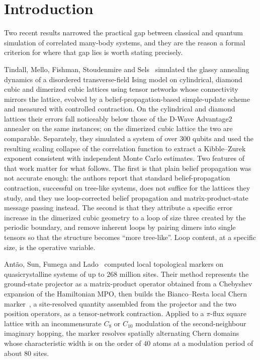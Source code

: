 \documentclass[aps,prx,reprint,nofootinbib,floatfix]{revtex4-2}
\begin{document}
\section{Introduction}
\label{sec:intro}

Two recent results narrowed the practical gap between classical and quantum
simulation of correlated many-body systems, and they are the reason a formal
criterion for where that gap lies is worth stating precisely.

Tindall, Mello, Fishman, Stoudenmire and
Sels~\cite{TindallMelloFishmanStoudenmireSels2026Science392} simulated the
glassy annealing dynamics of a disordered transverse-field Ising model on
cylindrical, diamond cubic and dimerized cubic lattices using tensor networks
whose connectivity mirrors the lattice, evolved by a belief-propagation-based
simple-update scheme and measured with controlled contraction. On the
cylindrical and diamond lattices their errors fall noticeably below those of
the D-Wave Advantage2 annealer on the same instances; on the dimerized cubic
lattice the two are comparable. Separately, they simulated a system of over
$300$ qubits and used the resulting scaling collapse of the correlation
function to extract a Kibble--Zurek exponent consistent with independent Monte
Carlo estimates. Two features of that work
matter for what follows. The first is that plain belief propagation was not
accurate enough: the authors report that standard belief-propagation
contraction, successful on tree-like systems, does not suffice for the lattices
they study, and they use loop-corrected belief propagation and matrix-product-state
message passing instead. The second is that they attribute a specific error
increase in the dimerized cubic geometry to a loop of size three created by the
periodic boundary, and remove inherent loops by pairing dimers into single
tensors so that the structure becomes ``more tree-like''. Loop content, at a
specific size, is the operative variable.

Antão, Sun, Fumega and Lado~\cite{AntaoSunFumegaLado2026PRL136} computed local
topological markers on quasicrystalline systems of up to $268$ million sites.
Their method represents the ground-state projector as a matrix-product operator
obtained from a Chebyshev expansion of the Hamiltonian MPO, then builds the
Bianco--Resta local Chern marker~\cite{BiancoResta2011}, a site-resolved
quantity assembled from the projector and the two position operators, as a
tensor-network contraction. Applied to a $\pi$-flux square lattice with an
incommensurate $C_8$ or $C_{10}$ modulation of the second-neighbour imaginary
hopping, the marker resolves spatially alternating Chern domains whose
characteristic width is on the order of $40$ atoms at a modulation period of
about $80$ sites.
\end{document}

